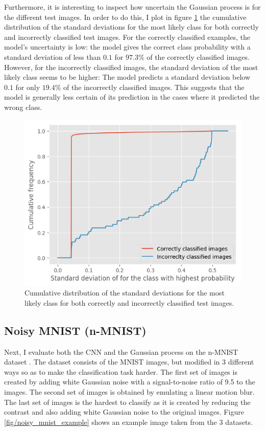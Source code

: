 \documentclass{article}
\begin{document}
Furthermore, it is interesting to inspect how uncertain the Gaussian process is for the different test images. In order to do this, I plot in figure \ref{fig/mnist_cum_stds} the cumulative distribution of the standard deviations for the most likely class for both correctly and incorrectly classified test images. For the correctly classified examples, the model's uncertainty is low: the model gives the correct class probability with a standard deviation of less than $0.1$ for $97.3\%$ of the correctly classified images. However, for the incorrectly classified images, the standard deviation of the most likely class seems to be higher: The model predicts a standard deviation below $0.1$ for only $19.4\%$ of the incorrectly classified images. This suggests that the model is generally less certain of its prediction in the cases where it predicted the wrong class.
\begin{figure}[h]
	\centering
	\includegraphics[scale=0.5]{mnist_cum_stds}
	\caption{Cumulative distribution of the standard deviations for the most likely class for both correctly and incorrectly classified test images.}
	\label{fig/mnist_cum_stds}
\end{figure}

\subsection{Noisy MNIST (n-MNIST)}
Next, I evaluate both the CNN and the Gaussian process on the n-MNIST dataset \cite{DBLP:journals/corr/BasuKGDMN15}. The dataset consists of the MNIST images, but modified in 3 different ways so as to make the classification task harder. The first set of images is created by adding white Gaussian noise with a signal-to-noise ratio of 9.5 to the images. The second set of images is obtained by emulating a linear motion blur. The last set of images is the hardest to classify as it is created by reducing the contrast and also adding white Gaussian noise to the original images. Figure \ref{fig/noisy_mnist_example} shows an example image taken from the 3 datasets.
\end{document}
